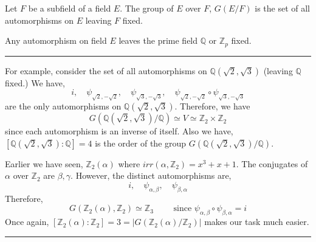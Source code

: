 \begin{definition}
	Let $F$ be a subfield of a field $E$.
	The group of $E$ over $F$, $G(E/F)$ is the set of all automorphisms on $E$ leaving $F$ fixed.
\end{definition}

\begin{important}
	Any automorphism on field $E$ leaves the prime field $\mathbb{Q}$ or $\mathbb{Z}_p$ fixed.
\end{important}
\hrule \vspace{1em}
For example, consider the set of all automorphisms on $\mathbb{Q}\left(\sqrt{2},\sqrt{3}\right)$ (leaving $\mathbb{Q}$ fixed.)
We have, 
\[ i,\quad \psi_{\sqrt{2},-\sqrt{2}},\quad \psi_{\sqrt{3},-\sqrt{3}},\quad \psi_{\sqrt{2},-\sqrt{2}} \circ \psi_{\sqrt{3},-\sqrt{3}} \]
are the only automorphisms on $\mathbb{Q}\left(\sqrt{2},\sqrt{3}\right)$.
Therefore, we have 
\[ G\left(\mathbb{Q}(\sqrt{2},\sqrt{3})/\mathbb{Q}\right) \simeq V \simeq \mathbb{Z}_2 \times \mathbb{Z}_2 \]
since each automorphism is an inverse of itself.
Also we have, $[\mathbb{Q}(\sqrt{2},\sqrt{3}) : \mathbb{Q}] = 4$ is the order of the group $G(\mathbb{Q}(\sqrt{2},\sqrt{3})/\mathbb{Q})$.\\

\begin{commentary}
	Earlier we have seen, $\mathbb{Z}_2(\alpha)$ where $irr(\alpha,\mathbb{Z}_2) = x^3+x+1$.
	The conjugates of $\alpha$ over $\mathbb{Z}_2$ are $\beta, \gamma$.
	However, the distinct automorphisms are,
	\[ i,\quad \psi_{\alpha,\beta},\quad \psi_{\beta,\alpha} \]
	Therefore,
	\[ G\left( \mathbb{Z}_2(\alpha),\mathbb{Z}_2 \right) \simeq \mathbb{Z}_3 \qquad \text{ since } \psi_{\alpha,\beta} \circ \psi_{\beta,\alpha} = i \]
	Once again, $[\mathbb{Z}_2(\alpha) : \mathbb{Z}_2] = 3 = |G(\mathbb{Z}_2(\alpha)/\mathbb{Z}_2)|$ makes our task much easier.
\end{commentary}
\hrule \vspace{1em}
